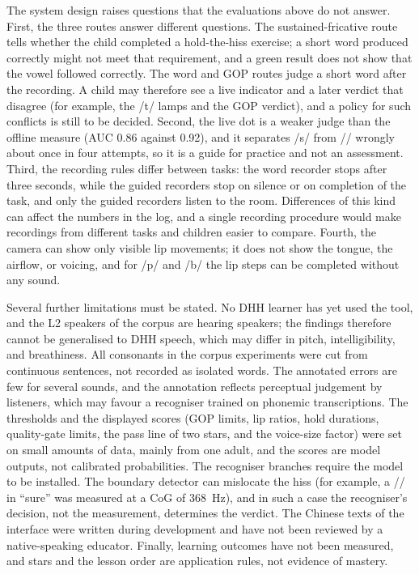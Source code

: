 \documentclass[conference]{IEEEtran}
\newcommand{\ipa}[1]{/#1/}
\begin{document}
The system design raises questions that the evaluations above do not answer. First, the three routes answer different questions. The sustained-fricative route tells whether the child completed a hold-the-hiss exercise; a short word produced correctly might not meet that requirement, and a green result does not show that the vowel followed correctly. The word and GOP routes judge a short word after the recording. A child may therefore see a live indicator and a later verdict that disagree (for example, the \ipa{t\textesh} lamps and the GOP verdict), and a policy for such conflicts is still to be decided. Second, the live dot is a weaker judge than the offline measure (AUC 0.86 against 0.92), and it separates \ipa{s} from \ipa{\textesh} wrongly about once in four attempts, so it is a guide for practice and not an assessment. Third, the recording rules differ between tasks: the word recorder stops after three seconds, while the guided recorders stop on silence or on completion of the task, and only the guided recorders listen to the room. Differences of this kind can affect the numbers in the log, and a single recording procedure would make recordings from different tasks and children easier to compare. Fourth, the camera can show only visible lip movements; it does not show the tongue, the airflow, or voicing, and for \ipa{p} and \ipa{b} the lip steps can be completed without any sound.

Several further limitations must be stated. No DHH learner has yet used the tool, and the L2 speakers of the corpus are hearing speakers; the findings therefore cannot be generalised to DHH speech, which may differ in pitch, intelligibility, and breathiness. All consonants in the corpus experiments were cut from continuous sentences, not recorded as isolated words. The annotated errors are few for several sounds, and the annotation reflects perceptual judgement by listeners, which may favour a recogniser trained on phonemic transcriptions. The thresholds and the displayed scores (GOP limits, lip ratios, hold durations, quality-gate limits, the pass line of two stars, and the voice-size factor) were set on small amounts of data, mainly from one adult, and the scores are model outputs, not calibrated probabilities. The recogniser branches require the model to be installed. The boundary detector can mislocate the hiss (for example, a \ipa{\textesh} in ``sure'' was measured at a CoG of 368~Hz), and in such a case the recogniser's decision, not the measurement, determines the verdict. The Chinese texts of the interface were written during development and have not been reviewed by a native-speaking educator. Finally, learning outcomes have not been measured, and stars and the lesson order are application rules, not evidence of mastery.
\end{document}
